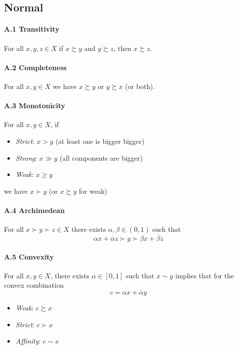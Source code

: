 \documentclass[landscape, 12pt]{extarticle}
\begin{document}
\begin{multicols}{2}
	\subsection{Normal}

	\paragraph{A.1 Transitivity}
	For all $x, y, z \in X$ if $x \succsim y$ and $y \succsim z$, then $x \succsim z$.

	\paragraph{A.2 Completeness}
	For all $x, y \in X$ we have $x \succsim y$ or $y \succsim x$ (or both).

	\paragraph{A.3 Monotonicity}
	For all $x, y \in X$, if
	\begin{itemize}
		\item \textit{Strict}: $x>y$ (at least one is bigger bigger)
		\item \textit{Strong}: $x \gg y$ (all components are bigger)
		\item \textit{Weak}: $x \geq y$
	\end{itemize}
	we have $x \succ y$ (or $x\succsim y$ for weak)

	\paragraph{A.4 Archimedean}
	For all $x \succ y \succ z \in X$ there exists $\alpha, \beta \in (0, 1)$ such that
	\[
		\alpha x + \overline \alpha z \succ y \succ \beta x + \overline \beta z
	\]

	\paragraph{A.5 Convexity}
	For all $x, y \in X$, there exists $\alpha \in [0, 1]$ such that $x \sim y$ implies
	that for the convex combination
	\[
		c = \alpha x + \overline \alpha y
	\]
	\begin{itemize}
		\item \textit{Weak}: $c \succsim x$
		\item \textit{Strict}: $c \succ x$
		\item \textit{Affinity}: $c \sim x$
	\end{itemize}


\end{multicols}
\end{document}
